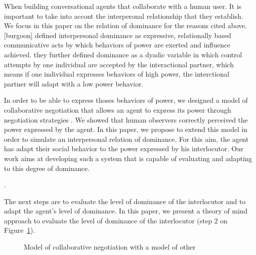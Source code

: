 \documentclass[conference, letterpaper]{IEEEtran}
\begin{document}
	When building conversational agents that collaborate with a human user. It is important  to take into accont the interperonal relationship that they establish. We focus in this paper on the relation of dominance for the reasons cited above.  [burgoon] defined interpersonal dominance as expressive, relationally based communicative acts by which behaviors of power are exerted and influence achieved. they further defined dominance as a dyadic variable in which control attempts by one individual are accepted by the
	interactional partner, which means if one individual expresses behaviors of high power, the interctional partner will adapt with a low power behavior. 
	
	In order to be able to express thoses behaviors of power,  we designed a model of collaborative negotiation that allows an agent to express its power through negotiation strategies \cite{ouali2017computational}. We showed that human observers correctly perceived the power expressed by the agent. In this paper, we propose to extend this model in order to simulate an interpersonal relation of dominance. For this aim, the agent has adapt their social behavior to the power expressed by his interlocutor. Our work aims at developing such a system that is capable of evaluating and adapting to this degree of dominance.
	

%	
. 
	
	
	The next steps are to evaluate the level of dominance of the interlocutor and to adapt the agent's level of dominance. In this paper, we present a theory of mind approach to evaluate the level of dominance of the interlocutor (step 2 on Figure~\ref{fig:schema-general}).
	
	\begin{figure}
		\caption{Model of collaborative negotiation with a model of other} 
		\label{fig:schema-general}
	\end{figure} 
	
\end{document}
